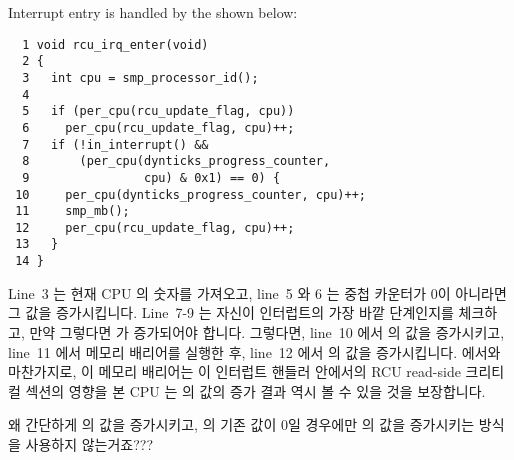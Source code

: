Interrupt entry is handled by the 
shown below:
\fi

{ \scriptsize
\begin{verbatim}
  1 void rcu_irq_enter(void)
  2 {
  3   int cpu = smp_processor_id();
  4
  5   if (per_cpu(rcu_update_flag, cpu))
  6     per_cpu(rcu_update_flag, cpu)++;
  7   if (!in_interrupt() &&
  8       (per_cpu(dynticks_progress_counter,
  9                cpu) & 0x1) == 0) {
 10     per_cpu(dynticks_progress_counter, cpu)++;
 11     smp_mb();
 12     per_cpu(rcu_update_flag, cpu)++;
 13   }
 14 }
\end{verbatim}
}

Line~3 는 현재 CPU 의 숫자를 가져오고, line~5 와 6 는  중첩
카운터가 0이 아니라면 그 값을 증가시킵니다.
Line~7-9 는 자신이 인터럽트의 가장 바깥 단계인지를 체크하고, 만약 그렇다면
 가 증가되어야 합니다.
그렇다면, line~10 에서  의 값을 증가시키고,
line~11 에서 메모리 배리어를 실행한 후, line~12 에서  의
값을 증가시킵니다.
 에서와 마찬가지로, 이 메모리 배리어는 이 인터럽트 핸들러
안에서의 RCU read-side 크리티컬 섹션의 영향을 본 CPU 는
 의 값의 증가 결과 역시 볼 수 있을 것을
보장합니다.
\iffalse

Line~3 fetches the current CPU's number, while lines~5 and~6
increment the \co{rcu_update_flag} nesting counter if it
is already non-zero.
Lines~7-9 check to see whether we are the outermost level of
interrupt, and, if so, \co{dynticks_progress_counter}
needs to be incremented.
If so, line~10 increments \co{dynticks_progress_counter},
line~11 executes a memory barrier, and line~12 increments
\co{rcu_update_flag}.
As with \co{rcu_exit_nohz()}, the memory barrier ensures that
any other CPU that sees the effects of an RCU read-side critical section
in the interrupt handler (following the \co{rcu_irq_enter()}
invocation) will also see the increment of
\co{dynticks_progress_counter}.
\fi

\QuickQuiz{}
	왜 간단하게  의 값을 증가시키고,
	 의 기존 값이 0일 경우에만
	 의 값을 증가시키는 방식을 사용하지
	않는거죠???
	\iffalse

